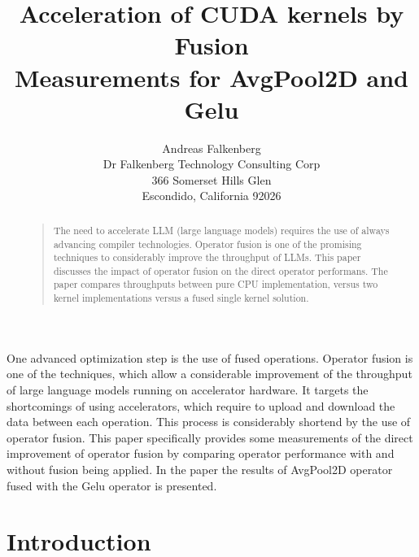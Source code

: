 \documentclass[letterpaper]{article}
\begin{document}
\title{Acceleration of CUDA kernels by Fusion \\ Measurements for AvgPool2D and Gelu}
\author{Andreas Falkenberg\\
Dr Falkenberg Technology Consulting Corp\\
366 Somerset Hills Glen\\
Escondido, California 92026\\
}

\maketitle

\begin{abstract}
\begin{quote}
The need to accelerate LLM (large language models) requires the use of always advancing compiler technologies. Operator fusion is one of the promising techniques to considerably improve the throughput of LLMs. This paper discusses the impact of operator fusion on the direct operator performans. The paper compares throughputs between pure CPU implementation, versus two kernel implementations versus a fused single kernel solution.  

\end{quote}
\end{abstract}

\noindent

One advanced optimization step is the use of fused operations. Operator fusion is one of the techniques, which allow a considerable improvement of the throughput of large language models running on accelerator hardware. It targets the shortcomings of using accelerators, which require to upload and download the data between each operation. This process is considerably shortend by the use of operator fusion. This paper specifically provides some measurements of the direct improvement of operator fusion by comparing operator performance with and without fusion being applied. In the paper the results of AvgPool2D operator fused with the Gelu operator is presented.


\section{Introduction}
\end{document}
